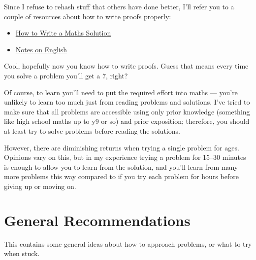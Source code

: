 Since I refuse to rehash stuff that others have done better, I'll refer you to a
couple of resources about how to write proofs properly:
\begin{itemize}
  \item
    \href{https://artofproblemsolving.com/news/articles/how-to-write-a-solution}
    {How to Write a Maths Solution}
  \item \href{https://web.evanchen.cc/handouts/english/english.pdf}{Notes on
    English}
\end{itemize}
Cool, hopefully now you know how to write proofs. Guess that means every time 
you solve a problem you'll get a 7, right?

Of course, to learn you'll need to put the required effort into maths --- you're
unlikely to learn too much just from reading problems and solutions. I've
tried to make sure that all problems are accessible using only prior knowledge
(something like high school maths up to y9 or so) and prior exposition;
therefore, you should at least try to solve problems before reading the
solutions.

However, there are diminishing returns when trying a single
problem for ages. Opinions vary on this, but in my experience trying a problem
for 15--30 minutes is enough to allow you to learn from the solution, and
you'll learn from many more problems this way compared to if you try
each problem for hours before giving up or moving on.
\section*{General Recommendations}
This contains some general ideas about how to approach problems, or what to
try when stuck.

